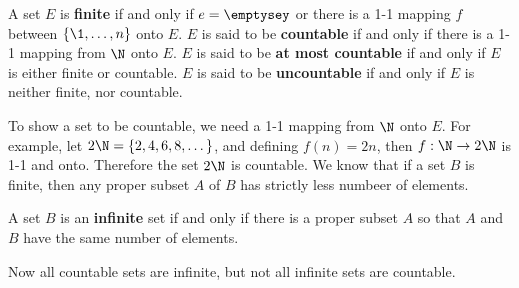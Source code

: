 \begin{definition}
    A set $E$ is  \textbf{finite} if and only if $e=\emptysey$ or there is a 1-1 mapping $f$ between $\{\1, \dots, n\}$ onto 
    $E$. $E$ is said to be \textbf{countable} if and only if there is a 1-1 mapping from $\N$ onto $E$. $E$ is said to be 
    \textbf{at most countable} if and only if $E$ is either finite or countable. $E$ is said to be \textbf{uncountable} if 
    and only if $E$ is neither finite, nor countable.
\end{definition}

To show a set to be countable, we need a 1-1 mapping from $\N$ onto $E$. For example, let $2\N=\{2,4,6,8, \dots\}$, and 
defining $f(n)=2n$, then $f:\N \rightarrow2\N$ is 1-1 and onto. Therefore the set $2\N$ is countable. We know that if a set 
$B$ is finite, then any proper subset $A$ of $B$ has strictly less numbeer of elements.

\begin{definition}
  A set $B$ is an \textbf{infinite} set if and only if there is a proper subset $A$ so that $A$ and $B$ have the same number 
  of elements.
\end{definition}

Now all countable sets are infinite, but not all infinite sets are countable.

